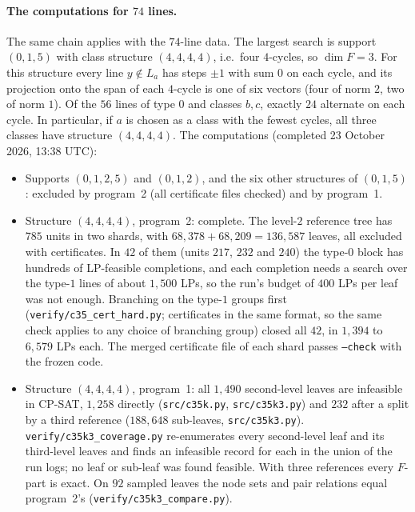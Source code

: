 \documentclass[11pt]{article}
\theoremstyle{definition}
\begin{document}
\paragraph{The computations for $74$ lines.} The same chain applies with the $74$-line data. The
largest search is support $(0,1,5)$ with class structure $(4,4,4,4)$, i.e.\ four $4$-cycles, so
$\dim F=3$. For this structure every line $y\notin L_a$ has steps $\pm1$ with sum $0$ on each cycle, and its
projection onto the span of each $4$-cycle is one of six vectors (four of norm $2$, two of norm $1$). Of the
$56$ lines of type $0$ and classes $b,c$, exactly $24$ alternate on each cycle. In particular, if $a$ is
chosen as a class with the fewest cycles, all three classes have structure $(4,4,4,4)$.
The computations (completed 23 October 2026, 13:38 UTC):
\begin{itemize}
\item Supports $(0,1,2,5)$ and $(0,1,2)$, and the six other structures of $(0,1,5)$: excluded by
program~2 (all certificate files checked) and by program~1.
\item Structure $(4,4,4,4)$, program~2: complete. The level-$2$ reference tree has $785$ units in two
shards, with $68{,}378+68{,}209=136{,}587$ leaves, all excluded with certificates. In $42$ of them (units
$217$, $232$ and $240$) the type-$0$ block has hundreds of LP-feasible completions, and each completion
needs a search over the type-$1$ lines of about $1{,}500$ LPs, so the run's budget of $400$ LPs per leaf
was not enough. Branching on the type-$1$ groups first (\texttt{verify/c35\_cert\_hard.py}; certificates
in the same format, so the same check applies to any choice of branching group) closed all $42$, in
$1{,}394$ to $6{,}579$ LPs each. The merged certificate file of each shard passes \texttt{--check} with
the frozen code.
\item Structure $(4,4,4,4)$, program~1: all $1{,}490$ second-level leaves are infeasible in CP-SAT,
$1{,}258$ directly (\texttt{src/c35k.py}, \texttt{src/c35k3.py}) and $232$ after a split by a third
reference ($188{,}648$ sub-leaves, \texttt{src/c35k3.py}). \texttt{verify/c35k3\_coverage.py}
re-enumerates every second-level leaf and its third-level leaves and finds an infeasible record for each
in the union of the run logs; no leaf or sub-leaf was found feasible. With three references every
$F$-part is exact. On $92$ sampled leaves the node sets and pair relations equal program~2's
(\texttt{verify/c35k3\_compare.py}).
\end{itemize}
\end{document}

